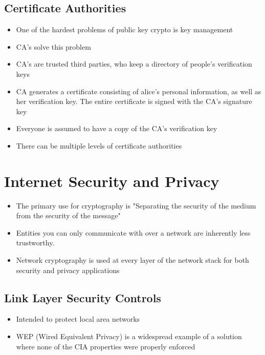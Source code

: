 \documentclass[twoside]{article}
\begin{document}
\subsection{Certificate Authorities}
\begin{itemize}
\item One of the hardest problems of public key crypto is key management
\item CA's solve this problem
\item CA's are trusted third parties, who keep a directory of people's verification keys 
\item CA generates a certificate consisting of alice's personal information, as well as her verification key. The entire certificate is signed with the CA's signature key
\item Everyone is assumed to have a copy of the CA's verification key
\item There can be multiple levels of certificate authorities
\end{itemize}

\section{Internet Security and Privacy}
\begin{itemize}
\item The primary use for cryptography is "Separating the security of the medium from the security of the message"
\item Entities you can only communicate with over a network are inherently less trustworthy.
\item Network cryptography is used at every layer of the network stack for both security and privacy applications
\end{itemize}

\subsection{Link Layer Security Controls}
\begin{itemize}
\item Intended to protect local area networks
\item WEP (Wired Equivalent Privacy) is a widespread example of a solution where none of the CIA properties were properly enforced
\end{itemize}
\end{document}
